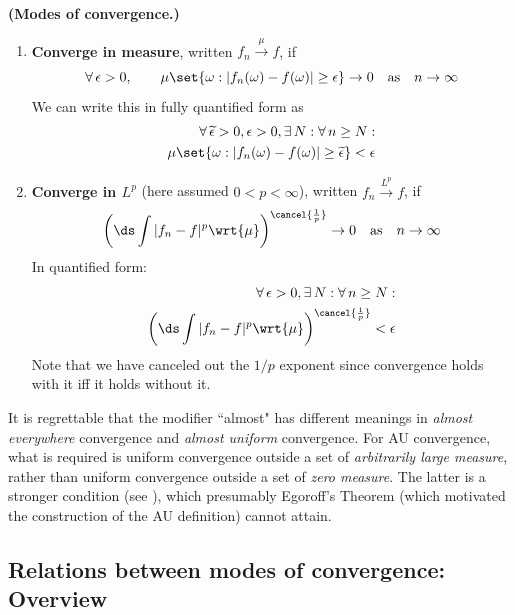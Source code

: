\documentclass{article} %
\newcommand{\dmu}{\wrt{\mu}}
\begin{document}
\begin{definition}{\textbf{(Modes of convergence.)}}
\begin{enumerate}
\item \textbf{Converge in measure}, written $f_n \stackrel{\mu}{\to} f$, if	
\[\forall \, \epsilon >0, \quad \quad \mu \set{\omega : |f_n(\omega) - f(\omega)| \geq \epsilon} \to 0 \quad \text{as} \quad n \to \infty \]
We can write this in fully quantified form as
\begin{align*}
\forall \, \epsilontilde>0, \epsilon>0, \exists \, N : \forall \, n \geq N: \\
\mu \set{\omega : |f_n(\omega) - f(\omega)| \geq \epsilontilde} < \epsilon
\end{align*}
\item \textbf{Converge in $L^p$} (here assumed $0 < p < \infty$), written $f_n \stackrel{L^p}{\to} f$, if	
\[ \bigg( \ds\int |f_n - f|^p \dmu \bigg)^{\cancel{\frac{1}{p}}} \to 0 \quad \text{as} \quad n \to \infty \]
In quantified form:
\begin{align*}
\forall \, \epsilon >0, \exists \, N : \forall \, n \geq N: \\
 \bigg( \ds\int |f_n - f|^p \dmu \bigg)^{\cancel{\frac{1}{p}}} < \epsilon 	
\end{align*}
Note that we have canceled out the $1/p$ exponent since convergence holds with it iff it holds without it. 


\end{enumerate}
\end{definition}

\begin{remark}{}
It is regrettable \cite[pp.72]{bartle2014elements} that the modifier ``almost" has different meanings in \textit{almost everywhere} convergence and \textit{almost uniform} convergence.  For AU convergence, what is required is uniform convergence outside a set of \textit{arbitrarily large measure}, rather than uniform convergence outside a set of \textit{zero measure}.  The latter is a stronger condition (see \cite[Exercise 7J]{bartle2014elements}), which presumably Egoroff's Theorem (which motivated the construction of the AU definition) cannot attain.
\end{remark}


\subsection{Relations between modes of convergence: Overview} \label{sec:overview_of_relations_between_modes_of_convergence}
\end{document}
